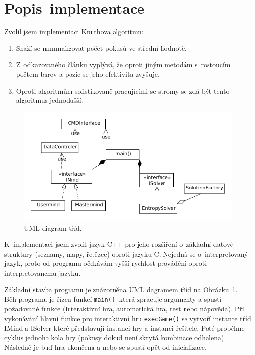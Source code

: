 \documentclass[12pt, a4paper]{article}
\begin{document}
\section{Popis~implementace} %

Zvolil jsem implementaci Knuthova algoritmu:
\begin{enumerate}
\item Snaží se minimalizovat počet pokusů ve střední hodnotě.
\item Z~odkazovaného článku vyplývá, že oproti jiným metodám s~rostoucím počtem barev a pozic se jeho efektivita zvyšuje.
\item Oproti algoritmům sofistikovaně pracujícími se stromy se zdá být tento algoritmus jednodušší. 
\end{enumerate}

\begin{figure}[ht]
\centering
\includegraphics[bb= 0 0 610 320 , width=14cm]{uml.png}
\caption{UML diagram tříd.}
\label{fig:uml}
\end{figure}

K~implementaci jsem zvolil jazyk C++ pro jeho rozšíření o~základní datové struktury (seznamy, mapy, řetězce) oproti jazyku C. Nejedná se o~interpretovaný jazyk, proto od programu očekávám vyšší rychlost provádění oproti interpretovanému jazyku.

Základní stavba programu je znázorněna UML dagramem tříd na Obrázku~\ref{fig:uml}. Běh programu je řízen funkcí \texttt{main()}, která zpracuje argumenty a spustí požadované funkce (interaktivní hra, automatická hra, test nebo nápověda). Při vykonávání hlavní funkce pro interaktivní hru \texttt{execGame()} se vytvoří instance tříd IMind a ISolver které představují instanci hry a instanci řešitele. Poté proběhne cyklus jednoho kola hry (pokusy dokud není skrytá kombinace odhalena). Následně je buď hra ukončena a nebo se spustí opět od inicializace.
\end{document}
